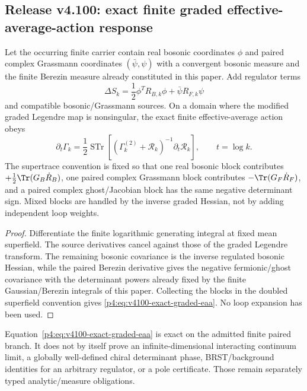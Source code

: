 \documentclass[12pt,a4paper]{article}
\begin{document}




\subsection{Release v4.100: exact finite graded effective-average-action response}
\label{p4:sec:v4100-exact-graded-eaa}

\begin{theorem}
\label{p4:thm:v4100-exact-graded-eaa}
Let the occurring finite carrier contain real bosonic coordinates $\phi$ and
paired complex Grassmann coordinates $(\bar\psi,\psi)$ with a convergent
bosonic measure and the finite Berezin measure already constituted in this
paper.  Add regulator terms
\[
 \Delta S_k
 =\frac12\phi^T R_{B,k}\phi+\bar\psi R_{F,k}\psi
\]
and compatible bosonic/Grassmann sources.  On a domain where the modified
graded Legendre map is nonsingular, the exact finite effective-average action
obeys
\begin{equation}
\label{p4:eq:v4100-exact-graded-eaa}
 \boxed{
 \partial_t\Gamma_k
 =\frac12\operatorname{STr}\!\left[
   (\Gamma_k^{(2)}+\mathcal R_k)^{-1}\partial_t\mathcal R_k
 \right],\qquad t=\log k .}
\end{equation}
The supertrace convention is fixed so that one real bosonic block contributes
$+\tfrac12\Tr(G_B\dot R_B)$, one paired complex Grassmann block contributes
$-\Tr(G_F\dot R_F)$, and a paired complex ghost/Jacobian block has the same
negative determinant sign.  Mixed blocks are handled by the inverse graded
Hessian, not by adding independent loop weights.
\end{theorem}

\begin{proof}
Differentiate the finite logarithmic generating integral at fixed mean
superfield.  The source derivatives cancel against those of the graded
Legendre transform.  The remaining bosonic covariance is the inverse
regulated bosonic Hessian, while the paired Berezin derivative gives the
negative fermionic/ghost covariance with the determinant powers already fixed
by the finite Gaussian/Berezin integrals of this paper.  Collecting the blocks
in the doubled superfield convention gives
\eqref{p4:eq:v4100-exact-graded-eaa}.  No loop expansion has been used.
\end{proof}

\begin{remark}
\label{p4:rem:v4100-graded-eaa-scope}
Equation~\eqref{p4:eq:v4100-exact-graded-eaa} is exact on the admitted finite
paired branch.  It does not by itself prove an infinite-dimensional
interacting continuum limit, a globally well-defined chiral determinant
phase, BRST/background identities for an arbitrary regulator, or a pole
certificate.  Those remain separately typed analytic/measure obligations.
\end{remark}
\end{document}
